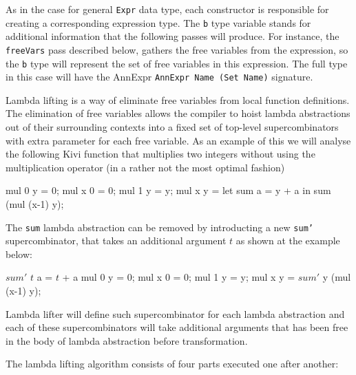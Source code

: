 \documentclass[12pt,a4paper]{report}
\begin{document}
As in the case for general \texttt{Expr} data type, each constructor is
responsible for creating a corresponding expression type. The \texttt{b} type
variable stands for additional information that the following passes will
produce. For instance, the \texttt{freeVars} pass described below, gathers the
free variables from the expression, so the \texttt{b} type will represent the
set of free variables in this expression. The full type in this case will have
the AnnExpr \texttt{AnnExpr Name (Set Name)} signature.

Lambda lifting is a way of eliminate free variables from local function
definitions. The elimination of free variables allows the compiler to hoist
lambda abstractions out of their surrounding contexts into a fixed set of
top-level supercombinators with extra parameter for each free variable. As an
example of this we will analyse the following Kivi function that multiplies two
integers without using the multiplication operator (in a rather not the most
optimal fashion)

\vspace*{0.2in}
\begin{code}[style=haskell]
mul 0 y = 0;
mul x 0 = 0;
mul 1 y = y;
mul x y =
    let sum a = y + a
    in sum (mul (x-1) y);
\end{code}

The \texttt{sum} lambda abstraction can be removed by introducting a new
\texttt{sum'} supercombinator, that takes an additional argument $t$ as shown at
the example below:

\vspace*{0.2in}
\begin{code}[style=haskell,mathescape=true]
$sum'$ $t$ a = $t$ + a
mul 0 y = 0;
mul x 0 = 0;
mul 1 y = y;
mul x y =
    $sum'$ y (mul (x-1) y);
\end{code}

Lambda lifter will define such supercombinator for each lambda abstraction and
each of these supercombinators will take additional arguments that has been
free in the body of lambda abstraction before transformation.

The lambda lifting algorithm consists of four parts executed one after another:

\vspace*{0.2in}
\end{document}
